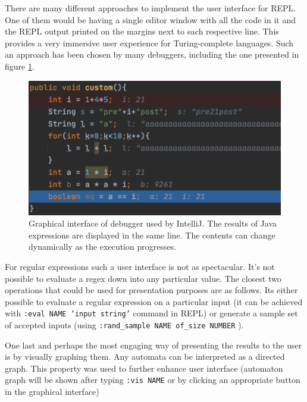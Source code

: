 There are many different approaches to implement the user interface for REPL.
One of them would be having a single editor window with all the code in it and the REPL output printed on the margins next to each respective line. This provides a very immersive user experience for Turing-complete languages. Such an approach has been chosen by many debuggers, including the one presented in figure \ref{intellij_debug}.
\begin{figure}[h]
\centering
\includegraphics[scale=0.85]{java_repl.png}
\caption{Graphical interface of debugger used by IntelliJ. The results of Java expressions are displayed in the same line. The contents can change dynamically as the execution progresses.}
\label{intellij_debug}
\end{figure}
For regular expressions such a user interface is not as spectacular. 
It's not possible to evaluate a regex down into any particular value.
The closest two operations that could be used for presentation purposes are as follows. Its either possible to evaluate a regular expression on a particular input (it can be achieved with \texttt{:eval NAME 'input string'} command in REPL) or generate a sample set of accepted inputs (using \texttt{:rand\_sample NAME of\_size NUMBER} ).

One last and perhaps the most engaging way of presenting the results to the user is by visually graphing them.
Any automata can be interpreted as a directed graph. This property  was used to further enhance user interface (automaton graph will be shown after typing \texttt{:vis NAME} or by clicking an appropriate button in the graphical interface)


